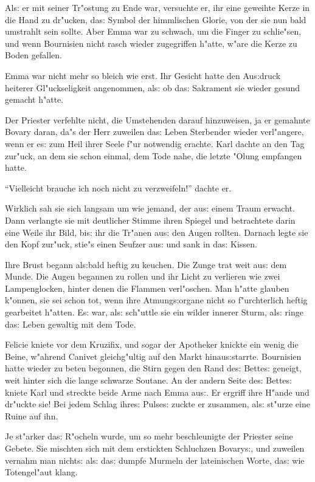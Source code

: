 \documentclass[oneside,12pt]{book}
\newcommand{\s}{s:}%
\begin{document}
Al{\s} er mit seiner Tr"ostung zu Ende war, versuchte er, ihr eine
geweihte Kerze in die Hand zu dr"ucken, da{\s} Symbol der
himmlischen Glorie, von der sie nun bald umstrahlt sein sollte.
Aber Emma war zu schwach, um die Finger zu schlie"sen, und wenn
Bournisien nicht rasch wieder zugegriffen h"atte, w"are die Kerze
zu Boden gefallen.

Emma war nicht mehr so bleich wie erst. Ihr Gesicht hatte den
Au{\s}druck heiterer Gl"uckseligkeit angenommen, al{\s} ob da{\s}
Sakrament sie wieder gesund gemacht h"atte.

Der Priester verfehlte nicht, die Umstehenden darauf hinzuweisen,
ja er gemahnte Bovary daran, da"s der Herr zuweilen da{\s} Leben
Sterbender wieder verl"angere, wenn er e{\s} zum Heil ihrer Seele
f"ur notwendig erachte. Karl dachte an den Tag zur"uck, an dem sie
schon einmal, dem Tode nahe, die letzte "Olung empfangen hatte.

"`Vielleicht brauche ich noch nicht zu verzweifeln!"' dachte er.

Wirklich sah sie sich langsam um wie jemand, der au{\s} einem
Traum erwacht. Dann verlangte sie mit deutlicher Stimme ihren
Spiegel und betrachtete darin eine Weile ihr Bild, bi{\s} ihr die
Tr"anen au{\s} den Augen rollten. Darnach legte sie den Kopf
zur"uck, stie"s einen Seufzer au{\s} und sank in da{\s} Kissen.

Ihre Brust begann al{\s}bald heftig zu keuchen. Die Zunge trat
weit au{\s} dem Munde. Die Augen begannen zu rollen und ihr Licht
zu verlieren wie zwei Lampenglocken, hinter denen die Flammen
verl"oschen. Man h"atte glauben k"onnen, sie sei schon tot, wenn
ihre Atmung{\s}organe nicht so f"urchterlich heftig gearbeitet
h"atten. E{\s} war, al{\s} sch"uttle sie ein wilder innerer Sturm,
al{\s} ringe da{\s} Leben gewaltig mit dem Tode.

Felicie kniete vor dem Kruzifix, und sogar der Apotheker knickte
ein wenig die Beine, w"ahrend Canivet gleichg"ultig auf den Markt
hinau{\s}starrte. Bournisien hatte wieder zu beten begonnen, die
Stirn gegen den Rand de{\s} Bette{\s} geneigt, weit hinter sich
die lange schwarze Soutane. An der andern Seite de{\s} Bette{\s}
kniete Karl und streckte beide Arme nach Emma au{\s}. Er ergriff
ihre H"ande und dr"uckte sie! Bei jedem Schlag ihre{\s} Pulse{\s}
zuckte er zusammen, al{\s} st"urze eine Ruine auf ihn.

Je st"arker da{\s} R"ocheln wurde, um so mehr beschleunigte der
Priester seine Gebete. Sie mischten sich mit dem erstickten
Schluchzen Bovary{\s}, und zuweilen vernahm man nicht{\s} al{\s}
da{\s} dumpfe Murmeln der lateinischen Worte, da{\s} wie
Totengel"aut klang.
\end{document}
